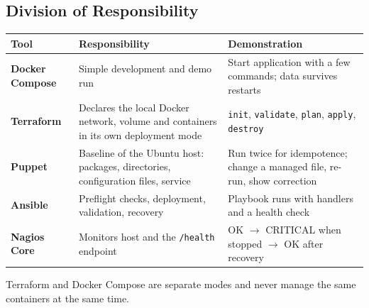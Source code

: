 \documentclass[12pt,a4paper]{article}
\begin{document}
\subsection{Division of Responsibility}
\begin{center}
\begin{tabular}{@{}>{\bfseries}p{2.6cm}p{5.2cm}p{6.2cm}@{}}
\toprule
Tool & Responsibility & Demonstration\\
\midrule
Docker Compose & Simple development and demo run & Start application with a few commands; data survives restarts\\
Terraform & Declares the local Docker network, volume and containers in its own deployment mode & \texttt{init}, \texttt{validate}, \texttt{plan}, \texttt{apply}, \texttt{destroy}\\
Puppet & Baseline of the Ubuntu host: packages, directories, configuration files, service & Run twice for idempotence; change a managed file, re-run, show correction\\
Ansible & Preflight checks, deployment, validation, recovery & Playbook runs with handlers and a health check\\
Nagios Core & Monitors host and the \texttt{/health} endpoint & OK $\rightarrow$ CRITICAL when stopped $\rightarrow$ OK after recovery\\
\bottomrule
\end{tabular}
\end{center}
Terraform and Docker Compose are separate modes and never manage the same containers at the same time.

\end{document}
